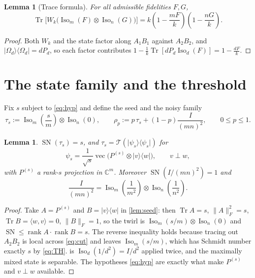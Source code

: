 \documentclass[11pt,reqno]{amsart}
\theoremstyle{plain}
\newtheorem{lemma}[theorem]{Lemma}
\theoremstyle{remark}
\DeclareMathOperator{\Tr}{Tr}
\DeclareMathOperator{\rank}{rank}
\DeclareMathOperator{\SN}{SN}
\DeclareMathOperator{\vecop}{vec}
\DeclareMathOperator{\Iso}{Iso}
\newcommand{\cT}{\mathcal T}
\newcommand{\ketbra}[2]{\lvert #1\rangle\!\langle #2\rvert}
\newcommand{\ip}[2]{\langle #1,#2\rangle}
\newcommand{\norm}[1]{\lVert #1\rVert}
\newcommand{\C}{\mathbb C}
\begin{document}
\begin{lemma}[Trace formula]
\label{lem:trace}
For all admissible fidelities $F,G$,
\begin{equation}
\label{eq:trace}
    \Tr\bigl[W_k\bigl(\Iso_m(F)\otimes\Iso_n(G)\bigr)\bigr]
    =
    k\left(1-\frac{mF}k\right)\left(1-\frac{nG}k\right).
\end{equation}
\end{lemma}

\begin{proof}
Both $W_k$ and the state factor along $A_1B_1$ against $A_2B_2$, and
$\ketbra{\Omega_d}{\Omega_d}=dP_d$, so each factor contributes
$1-\frac1k\Tr[dP_d\Iso_d(F)]=1-\frac{dF}k$.
\end{proof}

\section{The state family and the threshold}

Fix $s$ subject to \cref{eq:hyp} and define the seed and the noisy family
\begin{equation}
\label{eq:tau-rho}
    \tau_s:=\Iso_m\!\left(\frac sm\right)\otimes\Iso_n(0),
    \qquad
    \rho_p:=p\,\tau_s+(1-p)\frac I{(mn)^2},
    \qquad
    0\le p\le1 .
\end{equation}

\begin{lemma}
\label{lem:seed-SN}
$\SN(\tau_s)=s$, and $\tau_s=\cT(\ketbra{\psi_s}{\psi_s})$ for
\begin{equation}
\label{eq:psis}
    \psi_s=\frac1{\sqrt s}\vecop\bigl(P^{(s)}\otimes\ketbra vw\bigr),
    \qquad v\perp w,
\end{equation}
with $P^{(s)}$ a rank-$s$ projection in $\C^m$.  Moreover
$\SN(I/(mn)^2)=1$ and
\begin{equation}
\label{eq:noise-split}
    \frac I{(mn)^2}=\Iso_m\!\left(\frac1{m^2}\right)
                    \otimes\Iso_n\!\left(\frac1{n^2}\right).
\end{equation}
\end{lemma}

\begin{proof}
Take $A=P^{(s)}$ and $B=\ketbra vw$ in \cref{lem:seed}: then $\Tr A=s$,
$\norm A_F^2=s$, $\Tr B=\ip wv=0$, $\norm B_F=1$, so the twirl is
$\Iso_m(s/m)\otimes\Iso_n(0)$ and $\SN\le\rank A\cdot\rank B=s$.  The reverse
inequality holds because tracing out $A_2B_2$ is local across \cref{eq:cut} and
leaves $\Iso_m(s/m)$, which has Schmidt number exactly $s$ by \cref{eq:TH}.
 is $\Iso_d(1/d^2)=I/d^2$ applied twice, and the
maximally mixed state is separable.  The hypotheses \cref{eq:hyp} are exactly
what make $P^{(s)}$ and $v\perp w$ available.
\end{proof}
\end{document}
